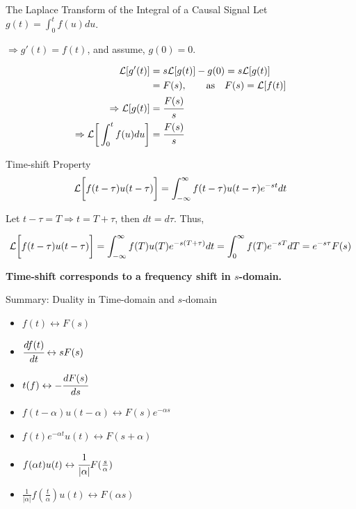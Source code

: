 \documentclass[aspectratio=169,xcolor=dvipsnames,svgnames,x11names,fleqn]{beamer}
\begin{document}
\begin{frame}{The Laplace Transform of the Integral of a Causal Signal}
    Let $g(t) = \int_0^t f(u) du$.

     $\Rightarrow g'(t) = f(t)$, and assume, $g(0) = 0$.

\begin{gradyellow}
    \begin{equation*}
        \begin{aligned}
               {\mathcal L} [ g'(t)] & = s{\mathcal L}[g(t)] - g(0)  = s{\mathcal L} [g(t)]\\
               & = F(s),\quad \text{~~~as~~~} F(s) = {\mathcal L}[f(t)]\\
               \Rightarrow {\mathcal L}[g(t)] & = \cfrac{F(s)}{s}\\
\Rightarrow {\mathcal L} \bigg[ \int_0^t f(u) du  \bigg] & = \cfrac{F(s)}{s}
        \end{aligned}
    \end{equation*}
\end{gradyellow}
\end{frame}

\begin{frame}{Time-shift Property}
$$
{\mathcal L} \bigg[f(t-\tau)u(t-\tau)\bigg] = \int_{-\infty}^\infty f(t-\tau)u(t-\tau) e^{-st}dt
$$

Let $t-\tau = T\Rightarrow t = T + \tau$, then $dt = d\tau$. Thus,

$$
{\mathcal L} \bigg[f(t-\tau)u(t-\tau)\bigg]  =  \int_{-\infty}^\infty f(T)u(T) e^{-s(T+\tau)}dt  =  \int_{0}^\infty f(T)e^{-sT}dT = e^{-s\tau}F(s)
$$

\bf \color{red}
Time-shift corresponds to a frequency shift in $s$-domain.
    
\end{frame}

\begin{frame}{Summary: Duality in Time-domain and $s$-domain}

\begin{itemize}
    \item $f(t) \leftrightarrow F(s)$
    \item $\cfrac{df(t)}{dt} \leftrightarrow sF(s)$
    \item $t(f) \leftrightarrow -\cfrac{dF(s)}{ds}$
    \item $f(t-\alpha)u(t-\alpha) \leftrightarrow F(s)e^{-\alpha s}$
    \item $f(t)e^{-\alpha t} u(t) \leftrightarrow F(s+\alpha) $
    \item $f(\alpha t) u(t) \leftrightarrow \cfrac{1}{|\alpha| }F(\tfrac{s}{\alpha})$

    \item $ \tfrac{1}{|\alpha|}f(\tfrac{t}{\alpha})u(t) \leftrightarrow  F(\alpha s)$
\end{itemize}
    
\end{frame}
\end{document}
